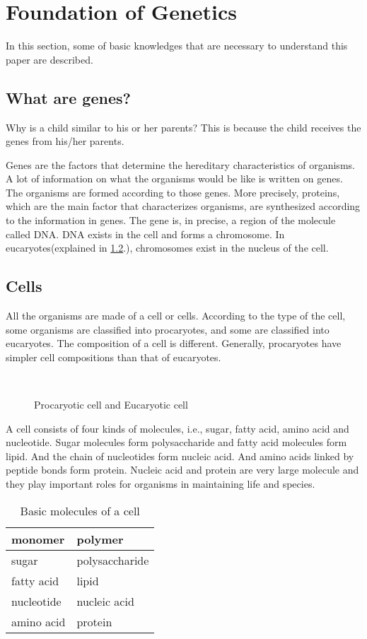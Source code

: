 
\section{Foundation of Genetics}
\label{founda}

In this section, some of basic knowledges that are necessary to 
understand this paper are described.

\subsection{What are genes?}
Why is a child similar to his or her parents? This is because the child
receives the genes from his/her parents.

Genes are the factors that determine the hereditary characteristics of
organisms. A lot of information on what the organisms would be like
is written on genes. The organisms are formed according to those genes.
More precisely, proteins, which are the main factor that characterizes
organisms, are synthesized according to the information in genes.
The gene is, in precise, a region of the molecule called DNA. 
DNA exists in the cell and forms a chromosome.
In eucaryotes(explained in \ref{cell}.),
chromosomes exist in the nucleus of the cell.


\subsection{Cells}\label{cell}
All the organisms are made of a cell or cells. According to the type
of the cell, some organisms are classified into procaryotes, and some
are classified into eucaryotes.
The composition of a cell is different. Generally, procaryotes have
simpler cell compositions than that of eucaryotes.

\begin{figure}
\ \ \ \ \ \ \ 
\caption{Procaryotic cell and Eucaryotic cell}
\end{figure}

A cell consists of four kinds of molecules, i.e., sugar, fatty acid, 
amino acid and nucleotide. 
Sugar molecules form polysaccharide and fatty acid molecules
form lipid. And the chain of nucleotides form nucleic acid.
And amino acids linked by peptide bonds form protein.
Nucleic acid and protein are very large molecule and they
play important roles for organisms in maintaining life and species. 

\begin{table}
\begin{center}
\begin{tabular}{|l|l|}
\hline
monomer & polymer\\
\hline
\hline
sugar & polysaccharide \\
fatty acid & lipid \\
nucleotide & nucleic acid \\
amino acid & protein \\
\hline
\end{tabular}

\end{center}
\caption{Basic molecules of a cell}
\end{table}

